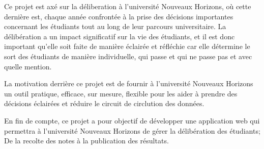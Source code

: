 Ce projet est axé sur la déliberation à l'université Nouveaux Horizons,
où cette dernière est, chaque année confrontée à la prise des
décisions importantes concernant les étudiants
tout au long de leur parcours universitaire. 
La délibération a un impact significatif sur 
la vie des étudiants, et il est donc important qu'elle
soit faite de manière éclairée et réfléchie car elle détermine 
le sort des étudiants de manière individuelle, qui passe et 
qui ne passe pas et avec quelle mention.


La motivation derrière ce projet est de fournir à  
l'université Nouveaux Horizons un outil pratique, efficace, 
sur mesure, flexible pour les aider à 
prendre des décisions éclairées et réduire le circuit de circlution
des données.

En fin de compte, ce projet a pour objectif de développer une application web
qui permettra à l'université Nouveaux Horizons de gérer
la délibération des étudiants; De la recolte des notes 
à la publication des résultats.

